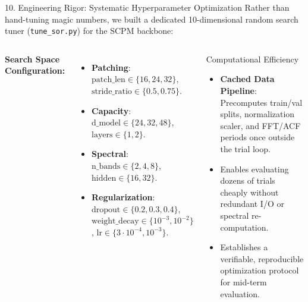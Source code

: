 \documentclass[aspectratio=169, 10pt]{beamer}
\begin{document}
\begin{frame}{10. Engineering Rigor: Systematic Hyperparameter Optimization}
Rather than hand-tuning magic numbers, we built a dedicated 10-dimensional random search tuner (\texttt{tune\_sor.py}) for the SCPM backbone:
\vspace{0.2cm}
\begin{columns}[T]
\textbf{Search Space Configuration:}
\begin{itemize}
    \item \textbf{Patching}: $\text{patch\_len} \in \{16, 24, 32\}$, $\text{stride\_ratio} \in \{0.5, 0.75\}$.
    \item \textbf{Capacity}: $\text{d\_model} \in \{24, 32, 48\}$, $\text{layers} \in \{1, 2\}$.
    \item \textbf{Spectral}: $\text{n\_bands} \in \{2, 4, 8\}$, $\text{hidden} \in \{16, 32\}$.
    \item \textbf{Regularization}: $\text{dropout} \in \{0.2, 0.3, 0.4\}$, $\text{weight\_decay} \in \{10^{-3}, 10^{-2}\}$, $\text{lr} \in \{3\cdot 10^{-4}, 10^{-3}\}$.
\end{itemize}

\begin{block}{Computational Efficiency}
\begin{itemize}
    \item \textbf{Cached Data Pipeline}: Precomputes train/val splits, normalization scaler, and FFT/ACF periods once outside the trial loop.
    \item Enables evaluating dozens of trials cheaply without redundant I/O or spectral re-computation.
    \item Establishes a verifiable, reproducible optimization protocol for mid-term evaluation.
\end{itemize}
\end{block}
\end{columns}
\end{frame}
\end{document}
